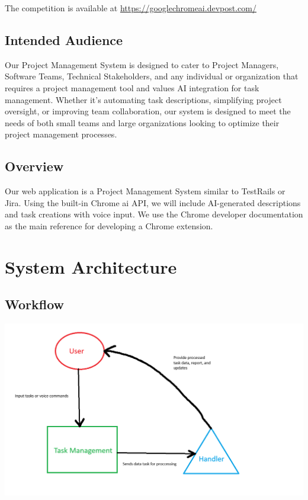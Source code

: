 \documentclass{article}
\begin{document}
The competition is available at \url{https://googlechromeai.devpost.com/}

\subsection{Intended Audience}
Our Project Management System is designed to cater to Project Managers, Software Teams, Technical Stakeholders, and any individual or organization that requires a project management tool and values AI integration for task management. Whether it's automating task descriptions, simplifying project oversight, or improving team collaboration, our system is designed to meet the needs of both small teams and large organizations looking to optimize their project management processes.

\subsection{Overview}
Our web application is a Project Management System similar to TestRails or Jira. Using the built-in Chrome \Gls{ai} API, we will include AI-generated descriptions and task creations with voice input. We use the Chrome developer documentation\cite{dev} as the main reference for developing a Chrome extension.

\section{System Architecture}

\subsection{Workflow}

\includegraphics[width=0.9\linewidth]{../logo/workflow.png} 
\end{document}
